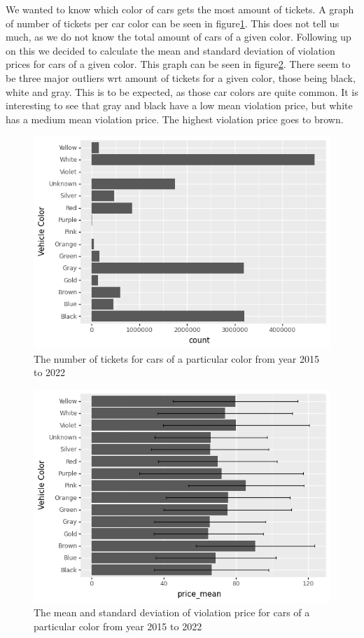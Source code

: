 \documentclass[12pt]{fphw}
\begin{document}
We wanted to know which color of cars gets the most amount of tickets. A graph of number of tickets per car color can be seen in figure\ref{fig:color_1}. This does not tell us much, as we do not know the total amount of cars of a given color. Following up on this we decided to calculate the mean and standard deviation of violation prices for cars of a given color. This graph can be seen in figure\ref{fig:color_2}.
There seem to be three major outliers wrt amount of tickets for a given color, those being black, white and gray. This is to be expected, as those car colors are quite common. It is interesting to see that gray and black have a low mean violation price, but white has a medium mean violation price. The highest violation price goes to brown.

\begin{figure}[h!]
  \label{fig:color_1}
  \includegraphics[width=1\textwidth]{figures2/VehicleColor_count.png}
  \caption{The number of tickets for cars of a particular color from year 2015 to 2022}
\end{figure}

\begin{figure}[h!]
  \label{fig:color_2}
  \includegraphics[width=1\textwidth]{figures2/VehicleColor_price.png}
  \caption{The mean and standard deviation of violation price for cars of a particular color from year 2015 to 2022}
\end{figure}
\end{document}
